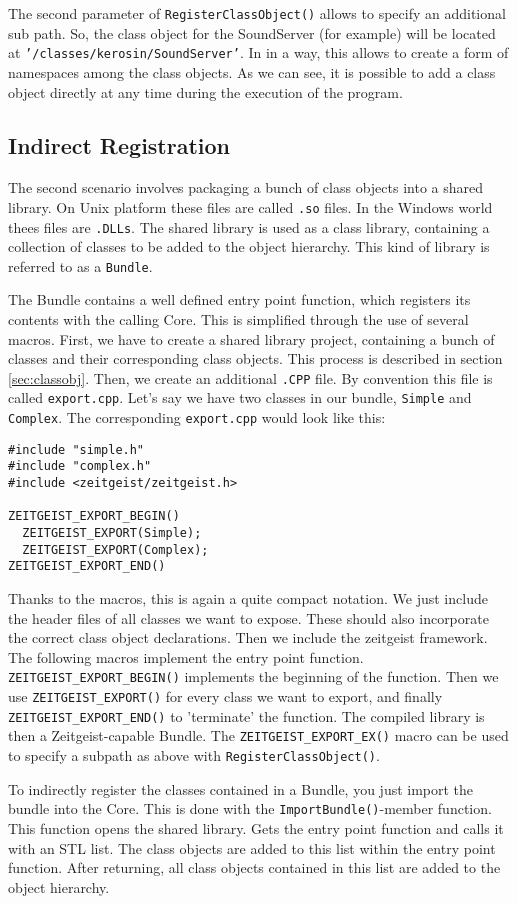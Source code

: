 The second parameter of \texttt{RegisterClassObject()} allows to
specify an additional sub path. So, the class object for the
SoundServer (for example) will be located at
\texttt{'/classes/kerosin/SoundServer'}. In in a way, this allows to create a
form of namespaces among the class objects. As we can see, it is
possible to add a class object directly at any time during the
execution of the program.

\subsection{Indirect Registration}

The second scenario involves packaging a bunch of class objects into a
shared library. On Unix platform these files are called \texttt{.so}
files. In the Windows world thees files are \texttt{.DLLs}. The shared
library is used as a class library, containing a collection of classes
to be added to the object hierarchy. This kind of library is referred
to as a \texttt{Bundle}. 

The Bundle contains a well defined entry point function, which
registers its contents with the calling Core. This is simplified
through the use of several macros. First, we have to create a shared
library project, containing a bunch of classes and their corresponding
class objects. This process is described in section
\ref{sec:classobj}. Then, we create an additional \texttt{.CPP} file. By convention
this file is called \texttt{export.cpp}. Let's say we have two classes
in our bundle, \texttt{Simple} and \texttt{Complex}. The corresponding
\texttt{export.cpp} would look like this:

\begin{verbatim}
#include "simple.h"
#include "complex.h"
#include <zeitgeist/zeitgeist.h>

ZEITGEIST_EXPORT_BEGIN()
  ZEITGEIST_EXPORT(Simple);
  ZEITGEIST_EXPORT(Complex);
ZEITGEIST_EXPORT_END()
\end{verbatim}


Thanks to the macros, this is again a quite compact notation. We just
include the header files of all classes we want to expose. These
should also incorporate the correct class object declarations. Then we
include the zeitgeist framework. The following macros implement the
entry point function. \texttt{ZEITGEIST\_EXPORT\_BEGIN()} implements
the beginning of the function. Then we use
\texttt{ZEITGEIST\_EXPORT()} for every class we want to export, and
finally \texttt{ZEITGEIST\_EXPORT\_END()} to 'terminate' the
function. The compiled library is then a Zeitgeist-capable Bundle. The
\texttt{ZEITGEIST\_EXPORT\_EX()} macro can be used to specify a subpath as above
with \texttt{RegisterClassObject()}.


To indirectly register the classes contained in a Bundle, you just
import the bundle into the Core. This is done with the
\texttt{ImportBundle()}-member function. This function opens the shared
library. Gets the entry point function and calls it with an STL
list. The class objects are added to this list within the entry point
function. After returning, all class objects contained in this list
are added to the object hierarchy.

